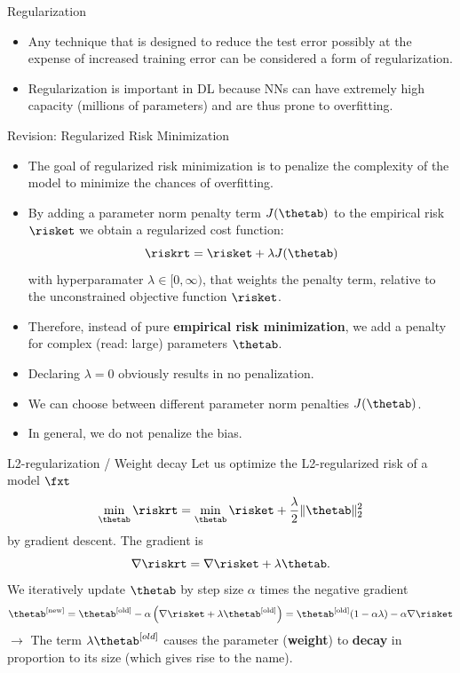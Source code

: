 







\begin{frame} {Regularization}
\begin{itemize}
\item Any technique that is designed to reduce the test error possibly at the expense of increased training error can be considered a form of regularization.
\item Regularization is important in DL because NNs can have extremely high capacity (millions of parameters) and are thus prone to overfitting.
\end{itemize}
\end{frame}

\begin{vbframe}{Revision: Regularized Risk Minimization}
\begin{itemize}
\item The goal of regularized risk minimization is to penalize the complexity of the model to minimize the chances of overfitting.
\item By adding a parameter norm penalty term \(J(\thetab)\) to the empirical risk $\risket$ we obtain a regularized cost function:
$$\riskrt = \risket + \lambda \text{\(J(\thetab)\)}$$
with hyperparamater $\lambda \in [0, \infty)$, that weights the penalty term, relative to the unconstrained objective function $\risket$.
\item Therefore, instead of pure \textbf{empirical risk minimization}, we add a penalty
for complex (read: large) parameters \(\thetab\).
\item Declaring $\lambda = 0$ obviously results in no penalization.
\item We can choose between different parameter norm penalties \(J(\thetab)\).
\item In general, we do not penalize the bias.
\end{itemize}
\end{vbframe}

\begin{vbframe}{L2-regularization / Weight decay}
Let us optimize the L2-regularized risk of a model $\fxt$
\[\min_{\thetab} \riskrt = \min_{\thetab} \risket + \frac{\lambda}{2} \|\thetab\|^2_2\]
by gradient descent. The gradient is
\[\nabla \riskrt = \nabla \risket + \lambda \thetab.\]
We iteratively update $\thetab$ by step size \(\alpha\) times the
negative gradient
\[\thetab^{[\text{new}]} = \thetab^{[\text{old}]} - \alpha \left(\nabla \risket + \lambda \thetab^{[\text{old}]}\right) =
\thetab^{[\text{old}]} (1 - \alpha \lambda) - \alpha \nabla \risket\]
$\to$ The term \(\lambda \thetab^{[old]}\) causes the parameter
(\textbf{weight}) to \textbf{decay} in proportion to its size (which gives rise to the name). 
\end{vbframe}

